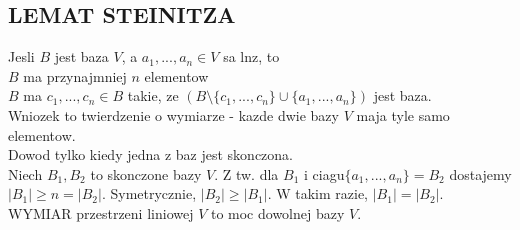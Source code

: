 \documentclass{article}
\begin{document}
\subsection*{LEMAT STEINITZA}
Jesli $B$ jest baza $V$, a $a_1, ..., a_n\in V$ sa lnz, to\\
$B$ ma przynajmniej $n$ elementow\\
$B$ ma $c_1, ..., c_n\in B$ takie, ze $(B\setminus\{c_1, ..., c_n\}\cup\{a_1, ..., a_n\})$ jest baza.\medskip\\
Wniozek to twierdzenie o wymiarze - kazde dwie bazy $V$ maja tyle samo elementow.\\
Dowod tylko kiedy jedna z baz jest skonczona.\\
Niech $B_1, B_2$ to skonczone bazy $V$. Z tw. dla $B_1$ i ciagu$\{a_1, ..., a_n\}=B_2$ dostajemy $|B_1|\geq n=|B_2|$. Symetrycznie, $|B_2|\geq |B_1|$. W takim razie, $|B_1|=|B_2|$. \\
WYMIAR przestrzeni liniowej $V$ to moc dowolnej bazy $V$.
\end{document}
